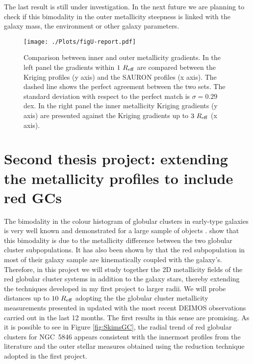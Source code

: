 	The last result is still under investigation.
	In the next future we are planning to check if this bimodality in the outer metallicity steepness is linked with the galaxy mass, 
	the environment or other galaxy parameters. 
	
	\begin{figure}
    	\begin{center}
			\texttt{[image: ./Plots/figU-report.pdf]}
		\end{center}
	    \caption[]{Comparison between inner and outer metallicity gradients. 
	    				In the left panel the gradients within $1~R_{\rm{eff}}$ are compared between the Kriging profiles (y axis) and 
	    				the SAURON profiles (x axis). 
	    				The dashed line shows the perfect agreement between the two sets. 
	    				The standard deviation with respect to the perfect match is $\sigma = 0.29$ dex. 
	    				In the right panel the inner metallicity Kriging gradients (y axis) are presented against the 
	    				Kriging gradients up to $3~R_{\rm{eff}}$ (x axis). 
	    }
    \label{fig:gradients}
  \end{figure}
	
	
\section{Second thesis project: extending the metallicity profiles to include red GCs}
	The bimodality in the colour histogram of globular clusters in early-type galaxies is very well known and demonstrated for a large 
	sample of objects \citep{Kundu01, Larsen01}. 
	\citet{Usher12} show that this bimodality is due to the metallicity difference between the two globular cluster 
	subpopulations. 
	It has also been shown by \citet{Pota13} that the red subpopulation in most of their galaxy sample are 
	kinematically coupled with the galaxy's. 
	Therefore, in this project we will study together the 2D metallicity fields of the red globular
	cluster systems in addition to the galaxy stars, thereby extending the techniques developed in my first project to larger radii. 
	We will probe distances up to $10~R_{\rm{eff}}$ adopting the the globular cluster metallicity measurements presented 
	in \citet{Usher12} updated with the most recent DEIMOS observations carried out in the last 12 months.
	The first results in this sense are promising. 
	As it is possible to see in Figure \ref{fig:SkimsGC}, the radial trend of red globular clusters for NGC~5846 appears 
	consistent with the innermost profiles from the literature and the outer stellar measures obtained using the reduction 
	technique adopted in the first project. 
  
